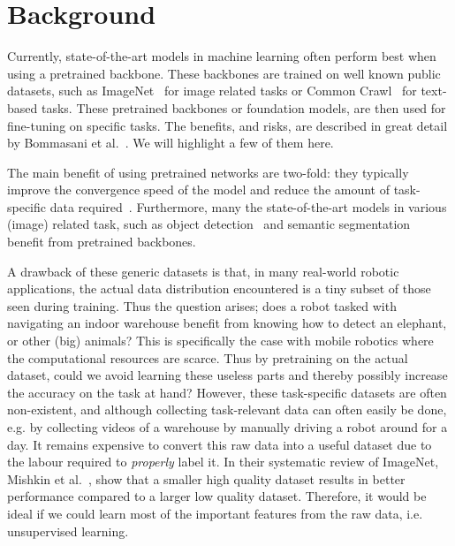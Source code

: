 \chapter{Background}\label{chapter:background}
Currently, state-of-the-art models in machine learning often perform best when using a pretrained backbone. These backbones are trained on well known public datasets, such as ImageNet~\cite{deng2009imagenet} for image related tasks or Common Crawl~\cite{commoncrawl} for text-based tasks. These pretrained backbones or foundation models, are then used for fine-tuning on specific tasks. The benefits, and risks, are described in great detail by Bommasani et al.~\cite{DBLP:journals/corr/abs-2108-07258}. We will highlight a few of them here.

The main benefit of using pretrained networks are two-fold: they typically improve the convergence speed of the model and reduce the amount of task-specific data required~\cite{donahue2014decaf,zeiler2014visualizing}. Furthermore, many the state-of-the-art models in various (image) related task, such as object detection~\cite{liu2016ssd,redmon2016you} and semantic segmentation~\cite{orsic2019defense,girshick2014rich} benefit from pretrained backbones.

A drawback of these generic datasets is that, in many real-world robotic applications, the actual data distribution encountered is a tiny subset of those seen during training. Thus the question arises; does a robot tasked with navigating an indoor warehouse benefit from knowing how to detect an elephant, or other (big) animals? This is specifically the case with mobile robotics where the computational resources are scarce. Thus by pretraining on the actual dataset, could we avoid learning these useless parts and thereby possibly increase the accuracy on the task at hand? However, these task-specific datasets are often non-existent, and although collecting task-relevant data can often easily be done, e.g. by collecting videos of a warehouse by manually driving a robot around for a day. It remains expensive to convert this raw data into a useful dataset due to the labour required to \emph{properly} label it.
In their systematic review of ImageNet, Mishkin et al.~\cite{MISHKIN201711}, show that a smaller high quality dataset results in better performance compared to a larger low quality dataset. Therefore, it would be ideal if we could learn most of the important features from the raw data, i.e. unsupervised learning.

